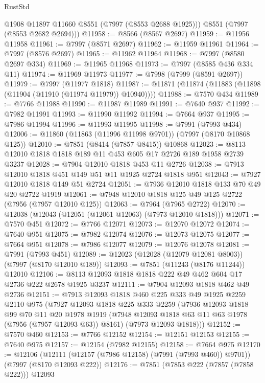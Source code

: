 \begin{lexlean}{RustStd}
\begin{coremodule}
        @1908
        @11897
        @11660
        @8551
        (@7997 (@8553 @2688 @1925)))
      @8551
      (@7997 (@8553 @2682 @2694)))
@11958 := @8566 (@8567 @2697)
@11959 := @11956 @11958
@11961 := @7997 (@8571 @2697)
@11962 := @11959 @11961
@11964 := @7997 (@8576 @2697)
@11965 := @11962 @11964
@11968 := @7997 (@8580 @2697 @334)
@11969 := @11965 @11968
@11973 := @7997 (@8585 @436 @334 @11)
@11974 := @11969 @11973
@11977 := @7998 (@7999 (@8591 @2697))
@11979 := @7997 (@11977 @1818)
@11987 := @11871 (@11874 (@11883 (@11898 (@11904 (@11910 (@11974 @11979)) @10940))))
@11988 := @7570 @434
@11989 := @7766 @11988
@11990 := @11987 @11989
@11991 := @7640 @937
@11992 := @7982 @11991
@11993 := @11990 @11992
@11994 := @7664 @937
@11995 := @7986 @11994
@11996 := @11993 @11995
@11998 := @7991 (@7993 @434)
@12006 := @11860 (@11863 (@11996 @11998 @9701)) (@7997 (@8170 @10868 @125))
@12010 := @7851 (@8414 (@7857 @8415)) @10868
@12023 := @8113 @12010 @1818 @1818 @189 @11 @453 @605 @17 @2726 @189 @1958 @2739 @3237
@12028 := @7904 @12010 @1818 @453 @11 @2726
@12038 := @7913 @12010 @1818 @451 @149 @51 @11 @1925 @2724 @1818 @951
@12043 := @7927 @12010 @1818 @149 @51 @2724
@12051 := @7936 @12010 @1818 @133 @70 @49 @20 @2722 @1919
@12061 := @7948 @12010 @1818 @125 @49 @125 @2722 (@7956 (@7957 @12010 @125))
@12063 := @7964 (@7965 @2722)
@12070 := @12038 (@12043 (@12051 (@12061 @12063) (@7973 @12010 @1818)))
@12071 := @7570 @451
@12072 := @7766 @12071
@12073 := @12070 @12072
@12074 := @7640 @951
@12075 := @7982 @12074
@12076 := @12073 @12075
@12077 := @7664 @951
@12078 := @7986 @12077
@12079 := @12076 @12078
@12081 := @7991 (@7993 @451)
@12089 := @12023 (@12028 (@12079 @12081 @8003)) (@7997 (@8170 @12010 @189))
@12093 := @7851 (@11243 (@8176 @11244)) @12010
@12106 := @8113 @12093 @1818 @1818 @222 @49 @462 @604 @17 @2736 @222 @2678 @1925 @3237
@12111 := @7904 @12093 @1818 @462 @49 @2736
@12151 := @7913
    @12093
    @1818
    @460
    @225
    @333
    @49
    @1925
    @2259
    @2110
    @975
    (@7927
      @12093
      @1818
      @225
      @333
      @2259
      (@7936
        @12093
        @1818
        @99
        @70
        @11
        @20
        @1978
        @1919
        (@7948 @12093 @1818 @63 @11 @63 @1978 (@7956 (@7957 @12093 @63)) @8161)
        (@7973 @12093 @1818)))
@12152 := @7570 @460
@12153 := @7766 @12152
@12154 := @12151 @12153
@12155 := @7640 @975
@12157 := @12154 (@7982 @12155)
@12158 := @7664 @975
@12170 := @12106
    (@12111 (@12157 (@7986 @12158) (@7991 (@7993 @460)) @9701))
    (@7997 (@8170 @12093 @222))
@12176 := @7851 (@7853 @222 (@7857 (@7858 @222))) @12093

\end{coremodule}
\end{lexlean}
